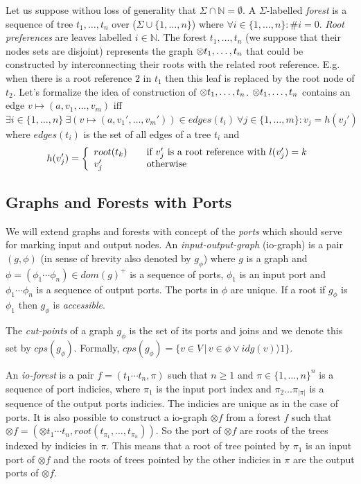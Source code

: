 Let us suppose withou loss of generality that $\Sigma \cap \mathbb{N} = \emptyset$.
A $\Sigma$-labelled \emph{forest} is a sequence of tree $t_1, \ldots, t_n$ over ($\Sigma \cup \{1,\ldots,n\}$)
where $\forall i \in \{1,\ldots,n\}: \#i = 0$.
\emph{Root preferences} are leaves labelled $i \in \mathbb{N}$.
The forest $t_1,\ldots,t_n$ (we suppose that their nodes sets are disjoint) represents the graph $\otimes t_1, \ldots, t_n$ that could
be constructed by interconnecting their roots with the related root reference.
E.g. when there is a root reference $2$ in $t_1$ then this leaf is replaced by the root node of $t_2$.
Let's formalize the idea of construction of $\otimes t_1, \ldots, t_n$.
$\otimes t_1, \ldots, t_n$ contains an edge $v \mapsto (a,v_1, \ldots,v_m)$ iff $\exists i \in \{1,\ldots,n\} \ \exists(v \mapsto (a, v_1', \ldots, v_m')) \in edges(t_i)
\ \forall j \in \{1,\ldots,m\}: v_j = h(v_j')$ where $edges(t_i)$ is the set of all edges of a tree $t_i$ and
\[ h(v_j') = \left\{
  \begin{array}{l l}
  root(t_k) & \quad \text{if $v_j'$ is a root reference with $l(v_j') = k$}\\
  v_j'   & \quad \text{otherwise}
  \end{array} \right.\]

\subsection{Graphs and Forests with Ports}
\label{subsec:gfp}

We will extend graphs and forests with concept of the \emph{ports} which should
serve for marking input and output nodes.
An \emph{input-output-graph} (io-graph) is a pair $(g,\phi)$ (in sense of brevity also denoted by $g_\phi$)
where $g$ is a graph and $\phi=(\phi_1 \cdots \phi_n) \in dom(g)^+$ is a sequence of ports, $\phi_1$
is an input port and $\phi_1 \cdots \phi_n$ is a sequence of output ports.
The ports in $\phi$ are unique.
If a root if $g_\phi$ is $\phi_1$ then $g_\phi$ is \emph{accessible}.

The \emph{cut-points} of a graph $g_\phi$ is the set of its ports and joins and we denote this set by $cps(g_\phi)$.
Formally, $cps(g_\phi)=\{v \in V\,|\, v \in \phi \vee idg(v) \rangle 1\}$.

An \emph{io-forest} is a pair $f=(t_1 \cdots t_n, \pi)$ such that $n \geq 1$ and $\pi \in \{1,\ldots,n\}^n$
is a sequence of port indicies, where $\pi_1$ is the input port index and $\pi_2 \ldots \pi_{|\pi|}$ is a sequence
of the output ports indicies.
The indicies are unique as in the case of ports.
It is also possible to construct a io-graph $\otimes f$ from a forest $f$ such that
$\otimes f = (\otimes t_1 \cdots t_n,root(t_{\pi_{1}},\ldots,t_{\pi_{n}}))$.
So the port of $\otimes f$ are roots of the trees indexed by indicies in $\pi$.
This means that a root of tree pointed by $\pi_1$ is an input port of $\otimes f$ and
the roots of trees pointed by the other indicies in $\pi$ are the output ports of $\otimes f$.


